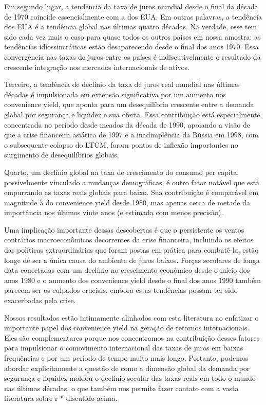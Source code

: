 Em segundo lugar, a tendência da taxa de juros mundial desde o final da década de 1970 coincide essencialmente com a dos EUA. Em outras palavras, a tendência dos EUA é a tendência global nas últimas quatro décadas. Na verdade, esse tem sido cada vez mais o caso para quase todos os outros países em nossa amostra: as tendências idiossincráticas estão desaparecendo desde o final dos anos 1970. Essa convergência nas taxas de juros entre os países é indiscutivelmente o resultado da crescente integração nos mercados internacionais de ativos.

Terceiro, a tendência de declínio da taxa de juros real mundial nas últimas décadas é impulsionada em extensão significativa por um aumento nos convenience yield, que aponta para um desequilíbrio crescente entre a demanda global por segurança e liquidez e sua oferta. Essa contribuição está especialmente concentrada no período desde meados da década de 1990, apoiando a visão de que a crise financeira asiática de 1997 e a inadimplência da Rússia em 1998, com o subsequente colapso do LTCM, foram pontos de inflexão importantes no surgimento de desequilíbrios globais.

Quarto, um declínio global na taxa de crescimento do consumo per capita, possivelmente vinculado a mudanças demográficas, é outro fator notável que está empurrando as taxas reais globais para baixo. Sua contribuição é comparável em magnitude à do convenience yield desde 1980, mas apenas cerca de metade da importância nos últimos vinte anos (e estimada com menos precisão).

Uma implicação importante dessas descobertas é que o persistente
os ventos contrários macroeconômicos decorrentes da crise financeira, incluindo os efeitos das políticas extraordinárias que foram postas em prática para combatê-la, estão longe de ser a única causa do ambiente de juros baixos. Forças seculares de longa data conectadas com um declínio no crescimento econômico desde o início dos anos 1980 e o aumento dos convenience yield desde o final dos anos 1990 também parecem ser os culpados cruciais, embora essas tendências possam ter sido exacerbadas pela crise.

Nossos resultados estão intimamente alinhados com esta literatura ao enfatizar o importante papel dos convenience yield na geração de retornos internacionais. Eles são complementares porque nos concentramos na contribuição desses fatores para impulsionar o comovimento internacional das taxas de juros em baixas frequências e por um período de tempo muito mais longo. Portanto, podemos abordar explicitamente a questão de como a dimensão global da demanda por segurança e liquidez moldou o declínio secular das taxas reais em todo o mundo nas últimas décadas, o que também nos permite fazer contato com a vasta literatura sobre r * discutido acima.

